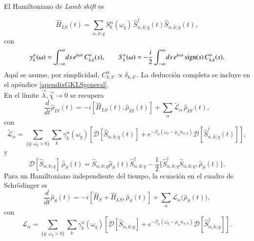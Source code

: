 El Hamiltoniano de \textit{Lamb shift} es 

\begin{equation*}
    \hat{H}_{LS}(t) = \sum_{\alpha,k;q} S^{\alpha}_{k}(\omega_{q})\,
    \hat{S}^{\dagger}_{\alpha,k;q}(t)\hat{S}_{\alpha,k;q}(t),
\end{equation*}
con
\begin{equation}
    \gamma_{k}^{\alpha}(\omega) = \int_{-\infty}^{\infty}\!ds\, e^{i\omega s}\,C^{\alpha}_{k,k}(s),
    \qquad
    S^{\alpha}_{k}(\omega) = - \frac{i}{2} \int_{-\infty}^{\infty}\!ds\, e^{i\omega s}\,\textnormal{sign}(s)\,C^{\alpha}_{k,k}(s).
    \label{sec2:gammaanddelta}
\end{equation}
Aquí se asume, por simplicidad, \(C^{\alpha}_{k,k'}\propto \delta_{k,k'}\). La deducción completa se incluye en el apéndice \ref{apendixGKLSgeneral}.
\\

En el límite \(\vec{\lambda},\vec{\chi}\to 0\) se recupera
\begin{equation*}
    \frac{d}{dt}\hat{\rho}_{IS}(t) 
    = - i[\hat{H}_{LS}(t),\hat{\rho}_{IS}(t)] 
      + \sum_{\alpha}\tilde{\mathcal{L}}_{\alpha}\,\hat{\rho}_{IS}(t),
\end{equation*}
con
\begin{equation*}
    \tilde{\mathcal{L}}_{\alpha} 
    = \sum_{\{q:\,\omega_{q}>0\}} \sum_{k}\gamma^{\alpha}_{k}(\omega_{q})
      \left[
        \mathcal{D}[\hat{S}_{\alpha,k;q}(t)]
        + e^{-\beta_{\alpha}(\omega_{q}-\mu_{\alpha}n_{\alpha,k})}
          \mathcal{D}[\hat{S}^{\dagger}_{\alpha,k;q}(t)]
      \right],
\end{equation*}
y
\begin{equation*}
    \mathcal{D}[\hat{S}_{\alpha,k;q}]\,\hat{\rho}_{S}(t)
    = \hat{S}_{\alpha,k;q}\hat{\rho}_{S}(t)\hat{S}^{\dagger}_{\alpha,k;q}
      - \frac{1}{2}\{\hat{S}^{\dagger}_{\alpha,k;q}\hat{S}_{\alpha,k;q},\hat{\rho}_{S}(t)\}.
\end{equation*}
Para un Hamiltoniano independiente del tiempo, la ecuación en el cuadro de Schrödinger es
\begin{equation}
    \frac{d}{dt}\hat{\rho}_{S}(t) 
    = -i [\hat{H}_{S}+ \hat{H}_{LS},\hat{\rho}_{S}(t)]
      + \sum_{\alpha}\mathcal{L}_{\alpha}\big(\hat{\rho}_{S}(t)\big),
    \label{sec2schrodingerthermo}
\end{equation}
con
\begin{equation}
    \mathcal{L}_{\alpha} 
    = \sum_{\{q:\,\omega_{q}>0\}} \sum_{k}\gamma^{\alpha}_{k}(\omega_{q})
      \left[
        \mathcal{D}[\hat{S}_{\alpha,k;q}]
        + e^{-\beta_{\alpha}(\omega_{q}-\mu_{\alpha}n_{\alpha,k})}
          \mathcal{D}[\hat{S}^{\dagger}_{\alpha,k;q}]
      \right].
    \label{sec2lindbladconsistency}
\end{equation}

